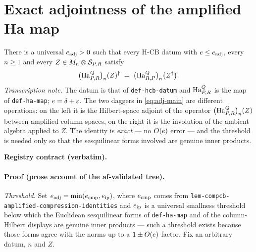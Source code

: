 \section{Exact adjointness of the amplified Ha map}\label{sec:hcb2-amplified-adjointness}

\begin{lemma}\label{lem:hcb2-amplified-adjointness}
There is a universal $e_{\mathrm{adj}}>0$ such that every H-CB datum with
$e\le e_{\mathrm{adj}}$, every $n\ge1$ and every $Z\in M_{n}\otimes \mathcal S_{P,R}$
satisfy
\begin{equation}\label{eq:adj-main}
  \bigl(\mathrm{Ha}^{Q}_{P,R}\bigr)_{n}(Z)^{\dagger}\;=\;\bigl(\mathrm{Ha}^{Q}_{R,P}\bigr)_{n}\bigl(Z^{\dagger}\bigr).
\end{equation}
\emph{Transcription note.} The datum is that of \texttt{def-hcb-datum} and
$\mathrm{Ha}^{Q}_{P,R}$ is the map of \texttt{def-ha-map}; $e=\delta+\varepsilon$. The two daggers in
\eqref{eq:adj-main} are different operations: on the left it is the Hilbert-space adjoint
of the operator $\bigl(\mathrm{Ha}^{Q}_{P,R}\bigr)_{n}(Z)$ between amplified column spaces, on the right it is
the involution of the ambient algebra applied to $Z$. The identity is \emph{exact} --- no
$O(e)$ error --- and the threshold is needed only so that the sesquilinear forms
involved are genuine inner products.
\end{lemma}

\noindent\textbf{Registry contract (verbatim).}

\paragraph{Proof (prose account of the af-validated tree).}
\emph{Threshold.} Set $e_{\mathrm{adj}}=\min(e_{\mathrm{cmp}},e_{\mathrm{ip}})$,
where $e_{\mathrm{cmp}}$ comes from
\texttt{lem-compcb-amplified-compression-identities} and $e_{\mathrm{ip}}$ is a
universal smallness threshold below which the Euclidean sesquilinear forms of
\texttt{def-ha-map} and of the column-Hilbert displays are genuine inner products --- such
a threshold exists because those forms agree with the norms up to a $1\pm O(e)$
factor. Fix an arbitrary datum, $n$ and $Z$.

